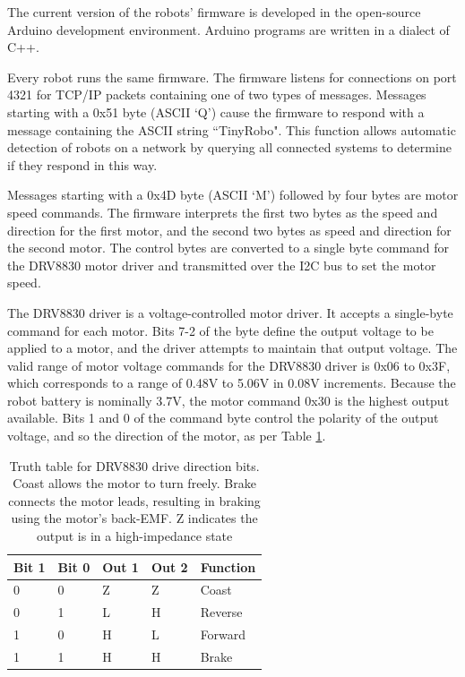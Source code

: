 The current version of the robots' firmware is developed in the open-source Arduino development environment.
Arduino programs are written in a dialect of C++. 

Every robot runs the same firmware. 
The firmware listens for connections on port 4321 for TCP/IP packets containing one of two types of messages. 
Messages starting with a 0x51 byte (ASCII `Q') cause the firmware to respond with a message containing the ASCII string ``TinyRobo". 
This function allows automatic detection of robots on a network by querying all connected systems to determine if they respond in this way. 

Messages starting with a 0x4D byte (ASCII `M') followed by four bytes are motor speed commands.
The firmware interprets the first two bytes as the speed and direction for the first motor, and the second two bytes as speed and direction for the second motor.
The control bytes are converted to a single byte command for the DRV8830 motor driver and transmitted over the I2C bus to set the motor speed.

The DRV8830 driver is a voltage-controlled motor driver. 
It accepts a single-byte command for each motor. 
Bits 7-2 of the byte define the output voltage to be applied to a motor, and the driver attempts to maintain that output voltage.
The valid range of motor voltage commands for the DRV8830 driver is 0x06 to 0x3F, which corresponds to a range of 0.48V to 5.06V in 0.08V increments. 
Because the robot battery is nominally 3.7V, the motor command 0x30 is the highest output available. 
Bits 1 and 0 of the command byte control the polarity of the output voltage, and so the direction of the motor, as per Table \ref{tab:DRV8830_truth}.

\begin{table}
	\centering
	\begin{tabular}{l l l l l}
		Bit 1 & Bit 0 & Out 1 & Out 2 & Function\\
		\hline
		0 & 0 & Z & Z & Coast\\
		0 & 1 & L & H & Reverse\\
		1 & 0 & H & L & Forward\\
		1 & 1 & H & H & Brake\\				
	\end{tabular}
	
	\caption{Truth table for DRV8830 drive direction bits. Coast allows the motor to turn freely. Brake connects the motor leads, resulting in braking using the motor's back-EMF. Z indicates the output is in a high-impedance state}
	\label{tab:DRV8830_truth}
\end{table}

